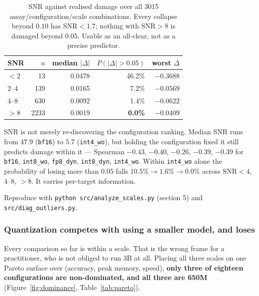 \documentclass[11pt]{article}
\newcommand{\cfg}[1]{\texttt{#1}}
\begin{document}
\begin{table}[htb]
\centering
\caption{SNR against realised damage over all 3015 assay/configuration/scale
combinations. Every collapse beyond $0.10$ has $\mathrm{SNR} < 1.7$; nothing
with $\mathrm{SNR} > 8$ is damaged beyond $0.05$. Usable as an all-clear, not
as a precise predictor.}
\label{tab:snr}
\small
\begin{tabular}{lrrrr}
\toprule
SNR & $n$ & median $|\Delta|$ & $P(|\Delta| > 0.05)$ & worst $\Delta$ \\
\midrule
$< 2$    &   13 & 0.0478 & 46.2\% & $-0.3688$ \\
$2$--$4$ &  139 & 0.0165 &  7.2\% & $-0.0569$ \\
$4$--$8$ &  630 & 0.0092 &  1.4\% & $-0.0622$ \\
$> 8$    & 2233 & 0.0019 &  \textbf{0.0\%} & $-0.0409$ \\
\bottomrule
\end{tabular}
\end{table}

SNR is not merely re-discovering the configuration ranking. Median SNR runs from
$47.9$ (\cfg{bf16}) to $5.7$ (\cfg{int4\_wo}), but holding the configuration
fixed it still predicts damage within it --- Spearman $-0.43$, $-0.40$, $-0.26$,
$-0.39$, $-0.39$ for \cfg{bf16}, \cfg{int8\_wo}, \cfg{fp8\_dyn},
\cfg{int8\_dyn}, \cfg{int4\_wo}. Within \cfg{int4\_wo} alone the probability of
losing more than $0.05$ falls $10.5\% \to 1.6\% \to 0.0\%$ across
$\mathrm{SNR} < 4$, $4$--$8$, $>8$. It carries per-target information.

Reproduce with \texttt{python src/analyze\_scales.py} (section 5) and
\texttt{src/diag\_outliers.py}.

\subsubsection{Quantization competes with using a smaller model, and loses}

Every comparison so far is within a scale. That is the wrong frame for a
practitioner, who is not obliged to run 3B at all. Placing all three scales on
one Pareto surface over (accuracy, peak memory, speed), \textbf{only three of
eighteen configurations are non-dominated, and all three are 650M}
(Figure~\ref{fig:dominance}, Table~\ref{tab:pareto}).
\end{document}
